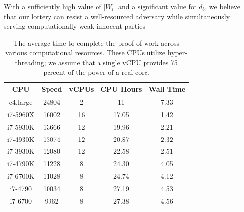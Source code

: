 \documentclass[USenglish,oneside,twocolumn]{article}
\newcommand*\nWinners{\left\vert{W_{i}}\right\vert}
\begin{document}
With a sufficiently high value of $ \nWinners $ and a significant value for $ d_{b} $, we believe that our lottery can resist a well-resourced adversary while simultaneously serving computationally-weak innocent parties.

\begin{center}
	\vspace{0mm}
	\begin{table}[htp]
		\hspace{5 mm}
  		\begin{tabular}{ | c | c | c | c | c | }
  		\textbf{CPU} & \textbf{Speed} & \textbf{vCPUs} & \textbf{CPU Hours} & \textbf{Wall Time} \\ \hline
  		c4.large & 24804 & 2 & 11 & 7.33 \\ \hline
  		i7-5960X	 & 16002 & 16 & 17.05 & 1.42 \\ \hline
  		i7-5930K & 13666 & 12 & 19.96 & 2.21 \\ \hline
  		i7-4930K & 13074 & 12 & 20.87 & 2.32 \\ \hline
  		i7-3930K & 12080 & 12 & 22.58 & 2.51 \\ \hline
  		i7-4790K & 11228 & 8 & 24.30 & 4.05 \\ \hline
  		i7-6700K & 11028 & 8 & 24.74 & 4.12 \\ \hline
  		i7-4790 & 10034 & 8 & 27.19 & 4.53 \\ \hline
  		i7-6700 & 9962 & 8 & 27.38 & 4.56 \\
		\end{tabular}
		\caption{The average time to complete the proof-of-work across various computational resources. These CPUs utilize hyper-threading; we assume that a single vCPU provides 75 percent of the power of a real core.}
		\label{table:PoWtime}
	\end{table}
	\vspace{-10mm}
\end{center}

\end{document}
